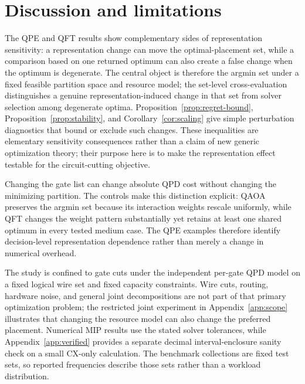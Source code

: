 \documentclass[
  aps,
  pra,
  reprint,
  amsmath,
  amssymb,
  longbibliography,
  nofootinbib,
  floatfix
]{revtex4-2}
\theoremstyle{plain}
\begin{document}
\section{Discussion and limitations}
\label{sec:discussion}

The QPE and QFT results show complementary sides of representation sensitivity: a representation change can move the optimal-placement set, while a comparison based on one returned optimum can also create a false change when the optimum is degenerate. The central object is therefore the argmin set under a fixed feasible partition space and resource model; the set-level cross-evaluation distinguishes a genuine representation-induced change in that set from solver selection among degenerate optima. Proposition~\ref{prop:regret-bound}, Proposition~\ref{prop:stability}, and Corollary~\ref{cor:scaling} give simple perturbation diagnostics that bound or exclude such changes. These inequalities are elementary sensitivity consequences rather than a claim of new generic optimization theory; their purpose here is to make the representation effect testable for the circuit-cutting objective.

Changing the gate list can change absolute QPD cost without changing the minimizing partition. The controls make this distinction explicit: QAOA preserves the argmin set because its interaction weights rescale uniformly, while QFT changes the weight pattern substantially yet retains at least one shared optimum in every tested medium case. The QPE examples therefore identify decision-level representation dependence rather than merely a change in numerical overhead.

The study is confined to gate cuts under the independent per-gate QPD model on a fixed logical wire set and fixed capacity constraints. Wire cuts, routing, hardware noise, and general joint decompositions are not part of that primary optimization problem; the restricted joint experiment in Appendix~\ref{app:scope} illustrates that changing the resource model can also change the preferred placement. Numerical MIP results use the stated solver tolerances, while Appendix~\ref{app:verified} provides a separate decimal interval-enclosure sanity check on a small CX-only calculation. The benchmark collections are fixed test sets, so reported frequencies describe those sets rather than a workload distribution.

\end{document}
